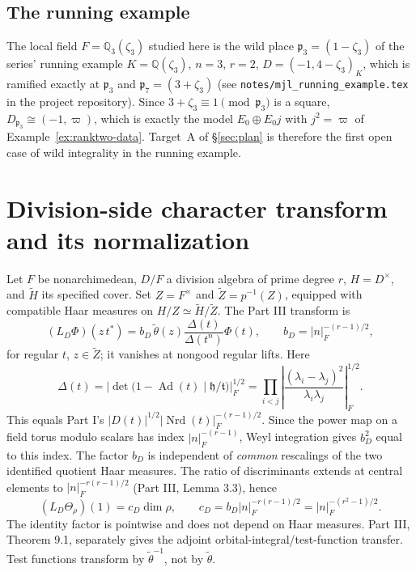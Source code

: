 \documentclass[11pt]{article}
\newcommand{\Nrd}{\operatorname{Nrd}}
\newcommand{\tH}{\widetilde H}
\newcommand{\tZ}{\widetilde Z}
\theoremstyle{plain}
\theoremstyle{definition}
\begin{document}
\subsection*{The running example}
The local field $F=\mathbb Q_3(\zeta_3)$ studied here is the wild place $\mathfrak p_3=(1-\zeta_3)$ of the series' running example $K=\mathbb{Q}(\zeta_3)$, $n=3$, $r=2$, $D=(-1,4-\zeta_3)_K$, which is ramified exactly at $\mathfrak p_3$ and $\mathfrak p_7=(3+\zeta_3)$ (see \texttt{notes/mjl\_running\_example.tex} in the project repository). Since $3+\zeta_3\equiv1\pmod{\mathfrak p_3}$ is a square, $D_{\mathfrak p_3}\cong(-1,\varpi)$, which is exactly the model $E_0\oplus E_0j$ with $j^2=\varpi$ of Example~\ref{ex:ranktwo-data}. Target~A of \S\ref{sec:plan} is therefore the first open case of wild integrality in the running example.

\section{Division-side character transform and its normalization}\label{sec:transform}
Let $F$ be nonarchimedean, $D/F$ a division algebra of prime
degree $r$, $H=D^\times$, and $\tH$ its specified cover.
Set $Z=F^\times$ and $\tZ=p^{-1}(Z)$, equipped with compatible
Haar measures on $H/Z\simeq\tH/\tZ$.  The Part III transform is
\begin{equation}\label{eq:LD}
 (L_D\Phi)(z\,t^*)
 =b_D\,\widetilde\theta(z)
  \frac{\Delta(t)}{\Delta(t^n)}\Phi(t),\qquad
 b_D=|n|_F^{-(r-1)/2},
\end{equation}
for regular $t$, $z\in\tZ$; it vanishes at nongood regular lifts.
Here
\begin{equation}\label{eq:Delta}
 \Delta(t)=\left|\det\bigl(1-\operatorname{Ad}(t)
 \mid\mathfrak h/\mathfrak t\bigr)\right|_F^{1/2}
 =\prod_{i<j}\left|
 \frac{(\lambda_i-\lambda_j)^2}{\lambda_i\lambda_j}
 \right|_F^{1/2}.
\end{equation}
This equals Part I's $|D(t)|^{1/2}|\Nrd(t)|_F^{-(r-1)/2}$.
Since the power map on a field torus modulo scalars has index
$|n|_F^{-(r-1)}$, Weyl integration gives $b_D^2$
equal to this index.  The factor $b_D$ is independent of
\emph{common} rescalings of the two identified quotient Haar
measures.  The ratio of discriminants extends at central elements
to $|n|_F^{-r(r-1)/2}$ (Part III, Lemma 3.3), hence
\begin{equation}\label{eq:cD}
 (L_D\Theta_\rho)(1)=c_D\dim\rho,\qquad
 c_D=b_D|n|_F^{-r(r-1)/2}
 =|n|_F^{-(r^2-1)/2}.
\end{equation}
The identity factor is pointwise and does not depend on Haar
measures.  Part III, Theorem 9.1, separately gives the adjoint
orbital-integral/test-function transfer.  Test functions transform
by $\widetilde\theta^{-1}$, not by $\widetilde\theta$.
\end{document}
